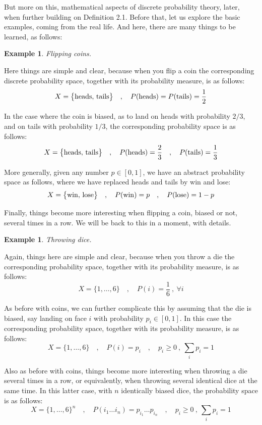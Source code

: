 \documentclass[12pt]{amsbook}
\newtheorem{example}[theorem]{Example}
\begin{document}
But more on this, mathematical aspects of discrete probability theory, later, when further building on Definition 2.1. Before that, let us explore the basic examples, coming from the real life. And here, there are many things to be learned, as follows:

\begin{example}
Flipping coins.
\end{example}

Here things are simple and clear, because when you flip a coin the corresponding discrete probability space, together with its probability measure, is as follows:
$$X=\big\{{\rm heads},\,{\rm tails}\big\}\quad,\quad P({\rm heads})=P({\rm tails})=\frac{1}{2}$$

In the case where the coin is biased, as to land on heads with probability $2/3$, and on tails with probability $1/3$, the corresponding probability space is as follows:
$$X=\big\{{\rm heads},\,{\rm tails}\big\}\quad,\quad P({\rm heads})=\frac{2}{3}\quad,\quad P({\rm tails})=\frac{1}{3}$$

More generally, given any number $p\in[0,1]$, we have an abstract probability space as follows, where we have replaced heads and tails by win and lose:
$$X=\big\{{\rm win},\,{\rm lose}\big\}\quad,\quad P({\rm win})=p\quad,\quad P({\rm lose})=1-p$$

Finally, things become more interesting when flipping a coin, biased or not, several times in a row. We will be back to this in a moment, with details.

\begin{example}
Throwing dice.
\end{example}

Again, things here are simple and clear, because when you throw a die the corresponding probability space, together with its probability measure, is as follows:
$$X=\big\{1,\ldots,6\big\}\quad,\quad P(i)=\frac{1}{6}\ ,\ \forall i$$

As before with coins, we can further complicate this by assuming that the die is biased, say landing on face $i$ with probability $p_i\in[0,1]$. In this case the corresponding probability space, together with its probability measure, is as follows:
$$X=\big\{1,\ldots,6\big\}\quad,\quad P(i)=p_i\quad,\quad p_i\geq0\ ,\ \sum_ip_i=1$$

Also as before with coins, things become more interesting when throwing a die several times in a row, or equivalently, when throwing several identical dice at the same time. In this latter case, with $n$ identically biased dice, the probability space is as follows:
$$X=\big\{1,\ldots,6\big\}^n\quad,\quad P(i_1\ldots i_n)=p_{i_1}\ldots p_{i_n}\quad,\quad p_i\geq0\ ,\ \sum_ip_i=1$$
\end{document}
